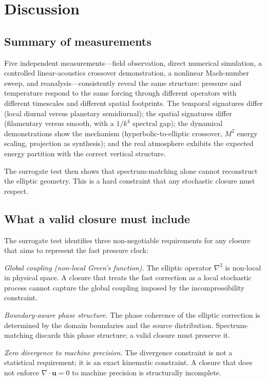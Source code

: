 \documentclass[11pt]{article}
\begin{document}
\section{Discussion}
\label{sec:discussion}

\subsection{Summary of measurements}

Five independent measurements---field observation, direct numerical simulation, a controlled linear-acoustics crossover demonstration, a nonlinear Mach-number sweep, and reanalysis---consistently reveal the same structure: pressure and temperature respond to the same forcing through different operators with different timescales and different spatial footprints. The temporal signatures differ (local diurnal versus planetary semidiurnal); the spatial signatures differ (filamentary versus smooth, with a $1/k^4$ spectral gap); the dynamical demonstrations show the mechanism (hyperbolic-to-elliptic crossover, $M^2$ energy scaling, projection as synthesis); and the real atmosphere exhibits the expected energy partition with the correct vertical structure.

The surrogate test then shows that spectrum-matching alone cannot reconstruct the elliptic geometry. This is a hard constraint that any stochastic closure must respect.

\subsection{What a valid closure must include}

The surrogate test identifies three non-negotiable requirements for any closure that aims to represent the fast pressure clock:

\emph{Global coupling (non-local Green's function).} The elliptic operator $\nabla^2$ is non-local in physical space. A closure that treats the fast correction as a local stochastic process cannot capture the global coupling imposed by the incompressibility constraint.

\emph{Boundary-aware phase structure.} The phase coherence of the elliptic correction is determined by the domain boundaries and the source distribution. Spectrum-matching discards this phase structure; a valid closure must preserve it.

\emph{Zero divergence to machine precision.} The divergence constraint is not a statistical requirement; it is an exact kinematic constraint. A closure that does not enforce $\nabla\cdot\mathbf{u} = 0$ to machine precision is structurally incomplete.
\end{document}
